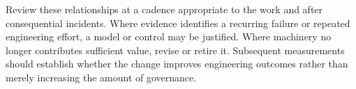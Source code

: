 Review these relationships at a cadence appropriate to the work and after consequential incidents. Where evidence identifies a recurring failure or repeated engineering effort, a model or control may be justified. Where machinery no longer contributes sufficient value, revise or retire it. Subsequent measurements should establish whether the change improves engineering outcomes rather than merely increasing the amount of governance.
